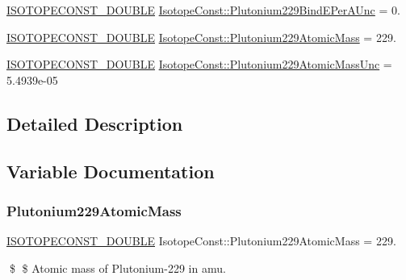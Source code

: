 \begin{DoxyCompactItemize}
\mbox{\hyperlink{group___isotope_const-_macros_ga8f45a7272ce02c0b4c65c44636ed719a}{I\+S\+O\+T\+O\+P\+E\+C\+O\+N\+S\+T\+\_\+\+D\+O\+U\+B\+LE}} \mbox{\hyperlink{group___isotope_const-_plutonium-_pu229_ga07ac68a94eab193b64a510bf89b629a3}{Isotope\+Const\+::\+Plutonium229\+Bind\+E\+Per\+A\+Unc}} = 0.
\item 
\mbox{\hyperlink{group___isotope_const-_macros_ga8f45a7272ce02c0b4c65c44636ed719a}{I\+S\+O\+T\+O\+P\+E\+C\+O\+N\+S\+T\+\_\+\+D\+O\+U\+B\+LE}} \mbox{\hyperlink{group___isotope_const-_plutonium-_pu229_ga281cce606db7585dfecb5056de885f5b}{Isotope\+Const\+::\+Plutonium229\+Atomic\+Mass}} = 229.
\item 
\mbox{\hyperlink{group___isotope_const-_macros_ga8f45a7272ce02c0b4c65c44636ed719a}{I\+S\+O\+T\+O\+P\+E\+C\+O\+N\+S\+T\+\_\+\+D\+O\+U\+B\+LE}} \mbox{\hyperlink{group___isotope_const-_plutonium-_pu229_gaa9514d5df9d0867408ad19b1469ee9e8}{Isotope\+Const\+::\+Plutonium229\+Atomic\+Mass\+Unc}} = 5.\+4939e-\/05
\end{DoxyCompactItemize}


\subsection{Detailed Description}


\subsection{Variable Documentation}
\mbox{\label{group___isotope_const-_plutonium-_pu229_ga281cce606db7585dfecb5056de885f5b}} 
\subsubsection{\texorpdfstring{Plutonium229\+Atomic\+Mass}{Plutonium229AtomicMass}}
{\footnotesize\ttfamily \mbox{\hyperlink{group___isotope_const-_macros_ga8f45a7272ce02c0b4c65c44636ed719a}{I\+S\+O\+T\+O\+P\+E\+C\+O\+N\+S\+T\+\_\+\+D\+O\+U\+B\+LE}} Isotope\+Const\+::\+Plutonium229\+Atomic\+Mass = 229.}

\$ \$ Atomic mass of Plutonium-\/229 in amu. \mbox{\label{group___isotope_const-_plutonium-_pu229_gaa9514d5df9d0867408ad19b1469ee9e8}} 
